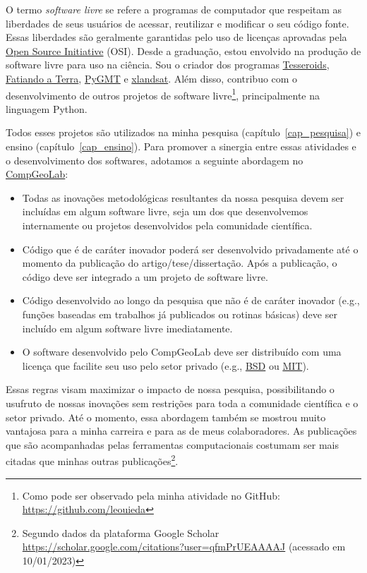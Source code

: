 \documentclass[10pt,a4paper,oneside]{book}
\begin{document}
O termo \textit{software livre} se refere a programas de computador que
respeitam as liberdades de seus usuários de acessar, reutilizar e modificar o
seu código fonte.
Essas liberdades são geralmente garantidas pelo uso de licenças aprovadas pela
\href{https://opensource.org/}{Open Source Initiative} (OSI).
Desde a graduação, estou envolvido na produção de software livre para uso na
ciência.
Sou o criador dos programas
\href{https://tesseroids.leouieda.com}{Tesseroids},
\href{https://www.fatiando.org}{Fatiando a Terra},
\href{https://www.pygmt.org}{PyGMT} e
\href{https://www.compgeolab.org/xlandsat}{xlandsat}.
Além disso, contribuo com o desenvolvimento de outros projetos de software
livre\footnote{Como pode ser observado pela minha atividade no GitHub:
\url{https://github.com/leouieda}}, principalmente na linguagem Python.

Todos esses projetos são utilizados na minha pesquisa
(capítulo~\ref{cap_pesquisa}) e ensino (capítulo~\ref{cap_ensino}).
Para promover a sinergia entre essas atividades e o desenvolvimento dos
softwares, adotamos a seguinte abordagem no
\href{https://www.compgeolab.org/}{CompGeoLab}:

\begin{itemize}
  \item Todas as inovações metodológicas resultantes da nossa pesquisa devem
    ser incluídas em algum software livre, seja um dos que desenvolvemos
    internamente ou projetos desenvolvidos pela comunidade científica.
  \item Código que é de caráter inovador poderá ser desenvolvido privadamente
    até o momento da publicação do artigo/tese/dissertação. Após a publicação,
    o código deve ser integrado a um projeto de software livre.
  \item Código desenvolvido ao longo da pesquisa que não é de caráter
    inovador (e.g., funções baseadas em trabalhos já publicados ou rotinas
    básicas) deve ser incluído em algum software livre imediatamente.
  \item O software desenvolvido pelo CompGeoLab deve ser distribuído com uma
    licença que facilite seu uso pelo setor privado (e.g.,
    \href{https://opensource.org/licenses/BSD-3-Clause}{BSD} ou
    \href{https://opensource.org/licenses/MIT}{MIT}).
\end{itemize}

Essas regras visam maximizar o impacto de nossa pesquisa, possibilitando o
usufruto de nossas inovações sem restrições para toda a comunidade científica e
o setor privado.
Até o momento, essa abordagem também se mostrou muito vantajosa para a minha
carreira e para as de meus colaboradores.
As publicações que são acompanhadas pelas ferramentas computacionais
\citep[e.g.,][]{Uieda2016,Uieda2017} costumam ser mais citadas que minhas
outras publicações\footnote{Segundo dados da plataforma Google Scholar
\url{https://scholar.google.com/citations?user=qfmPrUEAAAAJ} (acessado em
10/01/2023)}.
\end{document}
